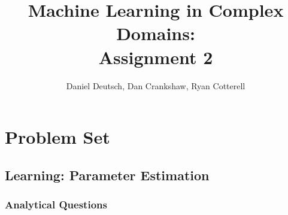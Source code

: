\documentclass[11pt,a4paper]{article}
\title{Machine Learning in Complex Domains:\\Assignment 2}
\author{Daniel Deutsch, Dan Crankshaw, Ryan Cotterell}
\date{}
\begin{document}
	\maketitle
	
	\setcounter{section}{2}
	\section{Problem Set}
	
	\subsection{Learning: Parameter Estimation}
	
	\setcounter{subsubsection}{4}
	\subsubsection{Analytical Questions}
	
\end{document}
